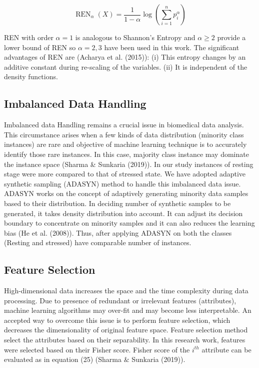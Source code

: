 \begin{equation}
\operatorname{REN}_{\alpha}(X)={\frac{1}{1-\alpha}}\log\left(\sum_{i=1}^{n}p_{i}^{\alpha}\right)
\end{equation}

REN with order $\alpha=1$ is analogous to Shannon’s Entropy and $\alpha\geq2$ provide a lower bound of REN so $\alpha=2,3$ have been used in this work. The significant advantages of REN are (Acharya et al. (2015)): (i) This entropy changes by an additive constant during re-scaling of the variables. (ii) It is independent of the density functions.

\subsection{Imbalanced Data Handling}

Imbalanced data Handling remains a crucial issue in biomedical data analysis. This circumstance arises when a few kinds of data distribution (minority class instances) are rare and objective of machine learning technique is to accurately identify those rare instances. In this case, majority class instance may dominate the instance space (Sharma \& Sunkaria (2019)). In our study instances of resting stage were more compared to that of stressed state. We have adopted adaptive synthetic sampling (ADASYN) method to handle this imbalanced data issue. ADASYN works on the concept of adaptively generating minority data samples based to their distribution. In deciding number of synthetic samples to be generated, it takes density distribution into account. It can adjust its decision boundary to concentrate on minority samples and it can also reduces the learning bias (He et al. (2008)). Thus, after applying ADASYN on both the classes (Resting and stressed) have comparable number of instances.

\subsection{Feature Selection}

High-dimensional data increases the space and the time complexity during data processing. Due to presence of redundant or irrelevant features (attributes), machine learning algorithms may over-fit and may become less interpretable. An accepted way to overcome this issue is to perform feature selection, which decreases the dimensionality of original feature space. Feature selection method select the attributes based on their separability. In this research work, features were selected based on their Fisher score. Fisher score of the $i^{t h}$ attribute can be evaluated as in equation (25) (Sharma $\&$ Sunkaria (2019)).

